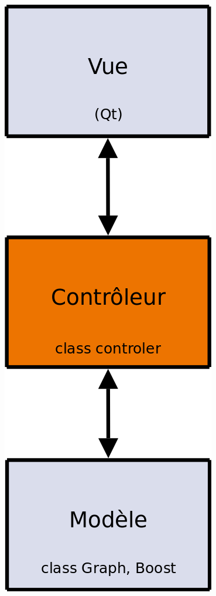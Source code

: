 {\begin{minipage}{0.45\textwidth}
\begin{flushleft}
\begin{center}
\includegraphics[height=0.95\textheight]{mvcScheme.png}
\end{center}
\end{flushleft}
\end{minipage}
\begin{minipage}{0.45\textwidth}

\end{minipage}}
